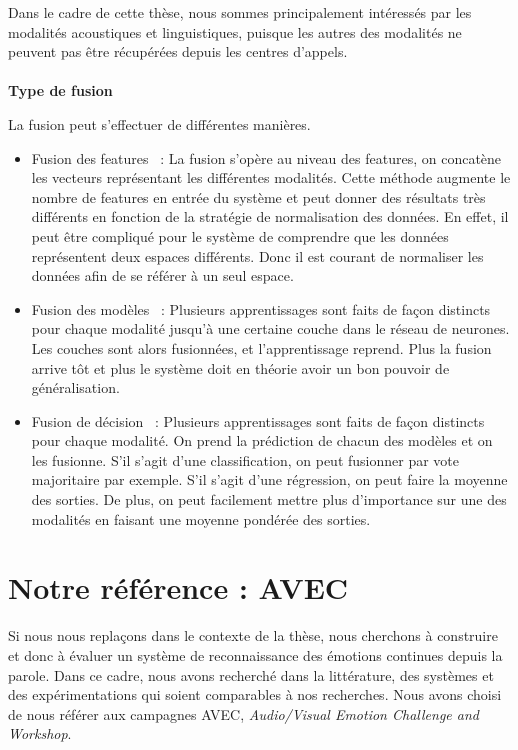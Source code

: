Dans le cadre de cette thèse, nous sommes principalement intéressés par les modalités acoustiques et linguistiques, puisque les autres des modalités ne peuvent pas être récupérées depuis les centres d'appels.
\\
\\
\textbf{Type de fusion}

La fusion peut s'effectuer de différentes manières.
\begin{itemize}
  \item Fusion des features~\cite{Wollmer2013,Alam2014,Atrey2010} : La fusion s'opère au niveau des features, on concatène les vecteurs représentant les différentes modalités. Cette méthode augmente le nombre de features en entrée du système et peut donner des résultats très différents en fonction de la stratégie de normalisation des données. En effet, il peut être compliqué pour le système de comprendre que les données représentent deux espaces différents. Donc il est courant de normaliser les données afin de se référer à un seul espace.
  \item Fusion des modèles~\cite{Atrey2010,Liu2018} : Plusieurs apprentissages sont faits de façon distincts pour chaque modalité jusqu'à une certaine couche dans le réseau de neurones. Les couches sont alors fusionnées, et l'apprentissage reprend. Plus la fusion arrive tôt et plus le système doit en théorie avoir un bon pouvoir de généralisation.
  \item Fusion de décision~\cite{Wollmer2013,Atrey2010} : Plusieurs apprentissages sont faits de façon distincts pour chaque modalité. On prend la prédiction de chacun des modèles et on les fusionne. S'il s'agit d'une classification, on peut fusionner par vote majoritaire par exemple. S'il s'agit d'une régression, on peut faire la moyenne des sorties. De plus, on peut facilement mettre plus d'importance sur une des modalités en faisant une moyenne pondérée des sorties.
\end{itemize}

\section{Notre référence : AVEC}


Si nous nous replaçons dans le contexte de la thèse, nous cherchons à construire et donc à évaluer un système de reconnaissance des émotions continues depuis la parole. Dans ce cadre, nous avons recherché dans la littérature, des systèmes et des expérimentations qui soient comparables à nos recherches. Nous avons choisi de nous référer aux campagnes AVEC, \textit{Audio/Visual Emotion Challenge and Workshop}.

